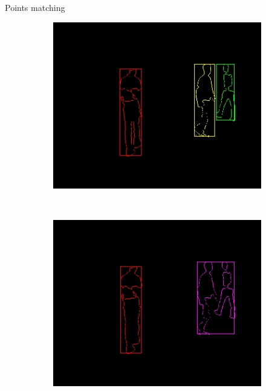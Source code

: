 \begin{frame}{Points matching}
  \begin{center}
   \begin{figure}[t]
      \begin{subfigure}[b]{0.32\textwidth}
	\includegraphics[width=\textwidth]{fig1.jpg}
      \end{subfigure}%
      ~
      \begin{subfigure}[b]{0.32\textwidth}
	\includegraphics[width=\textwidth]{fig2.jpg}
      \end{subfigure}%
      ~
      \begin{subfigure}[b]{0.32\textwidth}

\end{subfigure}
\end{figure}
\end{center}
\end{frame}
